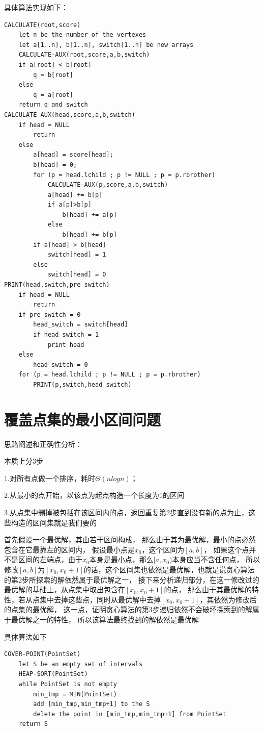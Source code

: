 \documentclass[cn,11pt,chinese]{elegantbook}
\begin{document}
具体算法实现如下：
\begin{lstlisting}
CALCULATE(root,score)
	let n be the number of the vertexes
	let a[1..n], b[1..n], switch[1..n] be new arrays
	CALCULATE-AUX(root,score,a,b,switch)
	if a[root] < b[root]
		q = b[root]
	else
		q = a[root]
	return q and switch
CALCULATE-AUX(head,score,a,b,switch)
	if head = NULL
		return
	else
		a[head] = score[head];
		b[head] = 0;
		for (p = head.lchild ; p != NULL ; p = p.rbrother)
			CALCULATE-AUX(p,score,a,b,switch)
			a[head] += b[p]
			if a[p]>b[p]
				b[head] += a[p]
			else
				b[head] += b[p]
		if a[head] > b[head]
			switch[head] = 1
		else
			switch[head] = 0
PRINT(head,switch,pre_switch)
	if head = NULL
		return
	if pre_switch = 0
		head_switch = switch[head]
		if head_switch = 1
			print head
	else
		head_switch = 0
	for (p = head.lchild ; p != NULL ; p = p.rbrother)
		PRINT(p,switch,head_switch)
\end{lstlisting}

\section{覆盖点集的最小区间问题}

思路阐述和正确性分析：

本质上分3步

1.对所有点做一个排序，耗时$\Theta(nlogn)$；

2.从最小的点开始，以该点为起点构造一个长度为1的区间

3.从点集中删掉被包括在该区间内的点，返回重复第2步直到没有新的点为止，这些构造的区间集就是我们要的

首先假设一个最优解，其由若干区间构成，
那么由于其为最优解，最小的点必然包含在它最靠左的区间内，
假设最小点是$x_0$，这个区间为$[a,b]$，
如果这个点并不是区间的左端点，由于$x_0$本身是最小点，那么$[a,x_0)$本身应当不含任何点，
所以修改$[a,b]$为$[x_0,x_0+1]$的话，这个区间集也依然是最优解，也就是说贪心算法的第2步所探索的解依然属于最优解之一，
接下来分析递归部分，在这一修改过的最优解的基础上，从点集中取出包含在$[x_0,x_0+1]$的点，
那么由于其最优解的特性，若从点集中去掉这些点，同时从最优解中去掉$[x_0,x_0+1]$，其依然为修改后的点集的最优解，
这一点，证明贪心算法的第3步递归依然不会破坏探索到的解属于最优解之一的特性，
所以该算法最终找到的解依然是最优解

具体算法如下
\begin{lstlisting}
COVER-POINT(PointSet)
	let S be an empty set of intervals
	HEAP-SORT(PointSet)
	while PointSet is not empty
		min_tmp = MIN(PointSet)	
		add [min_tmp,min_tmp+1] to the S
		delete the point in [min_tmp,min_tmp+1] from PointSet
	return S
\end{lstlisting}
\end{document}
